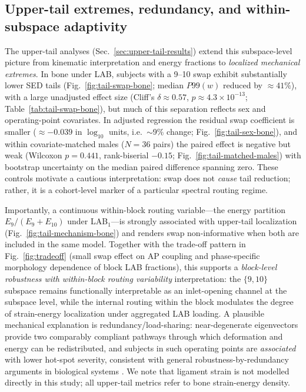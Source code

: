 \documentclass[11pt]{article}
\begin{document}
\subsection*{Upper-tail extremes, redundancy, and within-subspace adaptivity}
The upper-tail analyses (Sec.~\ref{sec:upper-tail-results}) extend this subspace-level picture from kinematic interpretation and energy fractions to \emph{localized mechanical extremes}.
In bone under LAB, subjects with a 9--10 swap exhibit substantially lower SED tails (Fig.~\ref{fig:tail-swap-bone}; median $P99(w)$ reduced by $\approx 41\%$), with a large unadjusted effect size (Cliff's $\delta \approx 0.57$, $p \approx 4.3\times10^{-13}$; Table~\ref{tab:tail-swap-bone}), but much of this separation reflects sex and operating-point covariates.
In adjusted regression the residual swap coefficient is smaller ($\approx -0.039$ in $\log_{10}$ units, i.e.\ $\sim$9\% change; Fig.~\ref{fig:tail-sex-bone}), and within covariate-matched males ($N=36$ pairs) the paired effect is negative but weak (Wilcoxon $p=0.441$, rank-biserial $-0.15$; Fig.~\ref{fig:tail-matched-males}) with bootstrap uncertainty on the median paired difference spanning zero.
These controls motivate a cautious interpretation: swap does not \emph{cause} tail reduction; rather, it is a cohort-level marker of a particular spectral routing regime.

Importantly, a continuous within-block routing variable---the energy partition $E_9/(E_9+E_{10})$ under LAB$_1$---is strongly associated with upper-tail localization (Fig.~\ref{fig:tail-mechanism-bone}) and renders swap non-informative when both are included in the same model.
Together with the trade-off pattern in Fig.~\ref{fig:tradeoff} (small swap effect on AP coupling and phase-specific morphology dependence of block LAB fractions), this supports a \emph{block-level robustness with within-block routing variability} interpretation: the $\{9,10\}$ subspace remains functionally interpretable as an inlet-opening channel at the subspace level, while the internal routing within the block modulates the degree of strain-energy localization under aggregated LAB loading.
A plausible mechanical explanation is redundancy/load-sharing: near-degenerate eigenvectors provide two comparably compliant pathways through which deformation and energy can be redistributed, and subjects in such operating points are \emph{associated} with lower hot-spot severity, consistent with general robustness-by-redundancy arguments in biological systems \citep{Kitano2004}.
We note that ligament strain is not modelled directly in this study; all upper-tail metrics refer to bone strain-energy density.
\end{document}
